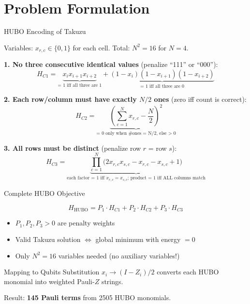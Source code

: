\documentclass[aspectratio=169]{beamer}
\begin{document}
\section{Problem Formulation}

\begin{frame}{HUBO Encoding of Takuzu}

Variables: $x_{r,c} \in \{0,1\}$ for each cell. Total: $N^2 = 16$ for $N=4$.

\bigskip
\textbf{1. No three consecutive identical values} (penalize ``111'' or ``000''):
$$H_{C1} = \underbrace{x_i x_{i+1} x_{i+2}}_{\text{= 1 iff all three are 1}} + \underbrace{(1{-}x_i)(1{-}x_{i+1})(1{-}x_{i+2})}_{\text{= 1 iff all three are 0}}$$

\bigskip
\textbf{2. Each row/column must have exactly $N/2$ ones} (zero iff count is correct):
$$H_{C2} = \underbrace{\left(\sum_{c=1}^N x_{r,c} - \frac{N}{2}\right)^2}_{\text{= 0 only when \#ones = N/2, else > 0}}$$

\bigskip
\textbf{3. All rows must be distinct} (penalize row $r$ = row $s$):
$$H_{C3} = \underbrace{\prod_{c=1}^N \bigl(2x_{r,c}x_{s,c} - x_{r,c} - x_{s,c} + 1\bigr)}_{\text{each factor = 1 iff } x_{r,c} = x_{s,c}\text{; product = 1 iff ALL columns match}}$$
\end{frame}

\begin{frame}{Complete HUBO Objective}

\begin{equation*}
    H_{\text{HUBO}} = P_1 \cdot H_{C1} + P_2 \cdot H_{C2} + P_3 \cdot H_{C3}
\end{equation*}

\bigskip
\begin{itemize}
    \item $P_1, P_2, P_3 > 0$ are penalty weights
    \item Valid Takuzu solution $\Leftrightarrow$ global minimum with energy $= 0$
    \item Only $N^2 = 16$ variables needed (no auxiliary variables!)
\end{itemize}

\bigskip
\begin{block}{Mapping to Qubits}
Substitution $x_i \rightarrow (I - Z_i)/2$ converts each HUBO monomial into weighted Pauli-$Z$ strings.

\medskip
Result: \textbf{145 Pauli terms} from 2505 HUBO monomials.
\end{block}
\end{frame}
\end{document}
